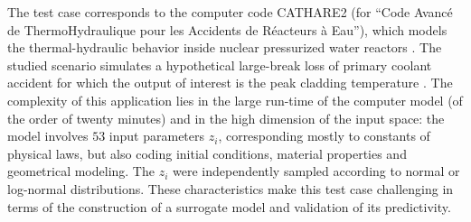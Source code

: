 The test case corresponds to the computer code CATHARE2 (for ``Code Avanc\'e de ThermoHydraulique pour les Accidents de R\'eacteurs \`a Eau''), which models the thermal-hydraulic behavior inside nuclear pressurized water reactors \citep{gefant11}. 
The studied scenario simulates a hypothetical large-break loss of primary coolant accident for which the output of interest is the peak cladding temperature \citep{decbaz08,ioobou10}. 
The complexity of this application lies in the large run-time of the computer model (of the order of twenty minutes) and in the high dimension of the input space: the model involves $53$ input parameters $z_i$, corresponding mostly to constants of physical laws, but also coding initial conditions, material properties and geometrical modeling. 
The $z_i$ were independently sampled according to normal or log-normal distributions. %
These characteristics make this test case challenging in terms of the construction of a surrogate model and validation of its predictivity.


